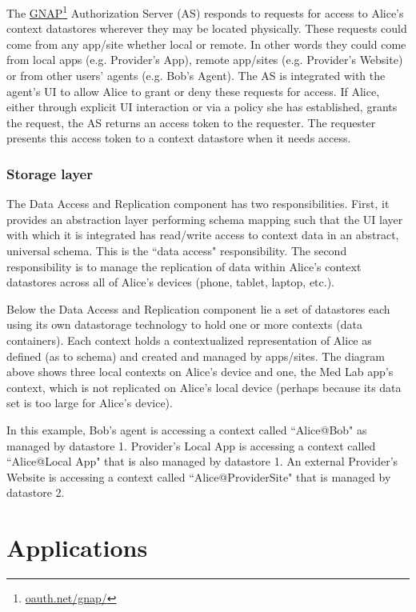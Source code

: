 \documentclass[11pt, oneside]{article}   	%
\newcommand{\hyperfootnote}[1][]{\def\ArgI{{#1}}\hyperfootnoteRelay}
\newcommand\hyperfootnoteRelay[2][]{\href{#1#2}{\ArgI}\footnote{\href{#1#2}{#2}}}
\begin{document}
The \hyperfootnote[GNAP][https://]{oauth.net/gnap/} Authorization Server (AS) responds to requests for access to Alice's context datastores wherever they may be located physically. These requests could come from any app/site whether local or remote. In other words they could come from local apps (e.g. Provider's App), remote app/sites (e.g. Provider's Website) or from other users' agents (e.g. Bob's Agent). The AS is integrated with the agent's UI to allow Alice to grant or deny these requests for access. If Alice, either through explicit UI interaction or via a policy she has established, grants the request, the AS returns an access token to the requester. The requester presents this access token to a context datastore when it needs access. 

\subsubsection{Storage layer}

The Data Access and Replication component has two responsibilities. First, it provides an abstraction layer performing schema mapping such that the UI layer with which it is integrated has read/write access to context data in an abstract, universal schema. This is the ``data access" responsibility. The second responsibility is to manage the replication of data within Alice's context datastores across all of Alice's devices (phone, tablet, laptop, etc.). 

Below the Data Access and Replication component lie a set of datastores each using its own datastorage technology to hold one or more contexts (data containers). Each context holds a contextualized representation of Alice as defined (as to schema) and created and managed by apps/sites. The diagram above shows three local contexts on Alice's device and one, the Med Lab app's context, which is not replicated on Alice's local device (perhaps because its data set is too large for Alice's device).

In this example, Bob's agent is accessing a context called ``Alice@Bob" as managed by datastore 1. Provider's Local App is accessing a context called ``Alice@Local App" that is also managed by datastore 1.  An external Provider's Website is accessing a context called ``Alice@ProviderSite" that is managed by datastore 2. 

\section{Applications}
\end{document}
